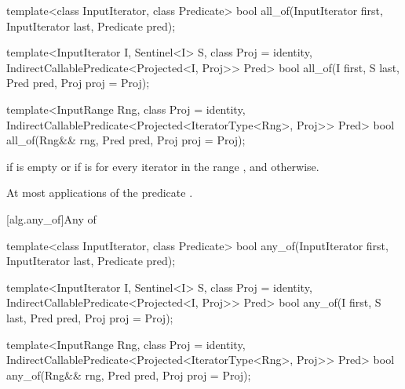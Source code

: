 %
\begin{removedblock}
\begin{itemdecl}
template<class InputIterator, class Predicate>
  bool all_of(InputIterator first, InputIterator last, Predicate pred);
\end{itemdecl}
\end{removedblock}
\begin{addedblock}
\begin{itemdecl}
template<InputIterator I, Sentinel<I> S, class Proj = identity,
    IndirectCallablePredicate<Projected<I, Proj>> Pred>
  bool all_of(I first, S last, Pred pred, Proj proj = Proj{});

template<InputRange Rng, class Proj = identity,
    IndirectCallablePredicate<Projected<IteratorType<Rng>, Proj>> Pred>
  bool all_of(Rng&& rng, Pred pred, Proj proj = Proj{});
\end{itemdecl}
\end{addedblock}

\begin{itemdescr}
\pnum
\returns {} if
 is empty or if
is  for every iterator  in the range ,
and  otherwise.

\pnum
\complexity At most  applications of the predicate
.
\end{itemdescr}

[alg.any_of]{Any of}

%
\begin{removedblock}
\begin{itemdecl}
template<class InputIterator, class Predicate>
  bool any_of(InputIterator first, InputIterator last, Predicate pred);
\end{itemdecl}
\end{removedblock}
\begin{addedblock}
\begin{itemdecl}
template<InputIterator I, Sentinel<I> S, class Proj = identity,
    IndirectCallablePredicate<Projected<I, Proj>> Pred>
  bool any_of(I first, S last, Pred pred, Proj proj = Proj{});

template<InputRange Rng, class Proj = identity,
    IndirectCallablePredicate<Projected<IteratorType<Rng>, Proj>> Pred>
  bool any_of(Rng&& rng, Pred pred, Proj proj = Proj{});
\end{itemdecl}
\end{addedblock}

